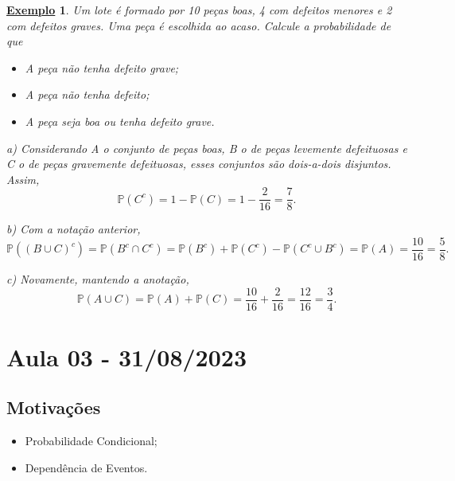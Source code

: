 \documentclass{article}
\newtheorem{example}{\underline{Exemplo}}
\begin{document}
\begin{example}
  Um lote é formado por 10 peças boas, 4 com defeitos menores e 2 com defeitos graves. Uma peça é escolhida ao acaso. Calcule a probabilidade de que 
 \begin{itemize}
   \item[a)] A peça não tenha defeito grave;
   \item[b)] A peça não tenha defeito;
   \item[c)] A peça seja boa ou tenha defeito grave.
 \end{itemize}
  a) Considerando A o conjunto de peças boas, B o de peças levemente defeituosas e C o de peças gravemente defeituosas, esses conjuntos são dois-a-dois disjuntos. Assim, 
    \[
      \mathbb{P}(C^{c}) = 1 - \mathbb{P}(C) = 1 - \frac{2}{16} = \frac{7}{8}.
    \]
    
  b) Com a notação anterior, 
    \[
      \mathbb{P}((B\cup C)^{c}) = \mathbb{P}(B^{c}\cap C^{c}) = \mathbb{P}(B^{c}) + \mathbb{P}(C^{c}) - \mathbb{P}(C^{c}\cup B^{c}) = \mathbb{P}(A) = \frac{10}{16} = \frac{5}{8}.
    \]

  c) Novamente, mantendo a anotação, 
    \[
      \mathbb{P}(A\cup C) = \mathbb{P}(A) + \mathbb{P}(C) = \frac{10}{16} + \frac{2}{16} = \frac{12}{16} = \frac{3}{4}.
    \]
\end{example}
\newpage

\section{Aula 03 - 31/08/2023}
\subsection{Motivações}
\begin{itemize}
  \item Probabilidade Condicional;
  \item Dependência de Eventos.
\end{itemize}
\end{document}
